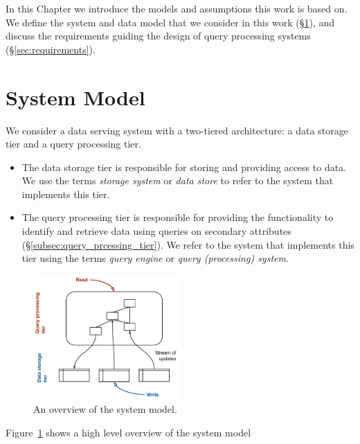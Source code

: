 In this Chapter we introduce the models and assumptions this work is based on.
We define the system and data model that we consider in this work (\S\ref{sec:models}),
and discuss the requirements guiding the design of query processing systems (\S\ref{sec:requirements}).

\section{System Model}
\label{sec:models}
We consider a data serving system with a two-tiered architecture: a data storage tier and a query processing tier.

\begin{itemize}
  \item The data storage tier is responsible for storing and providing access to data.
  We use the terms \textit{storage system} or \textit{data store} to refer to the system that implements this tier.

  \item The query processing tier is responsible for providing the functionality to identify and retrieve data using
  queries on secondary attributes (\S\ref{subsec:query_prcessing_tier}).
  We refer to the system that implements this tier using the terms \textit{query engine} or \textit{query (processing) system}.
\end{itemize}

\begin{figure}
  \centering
    \includegraphics[width=0.5\textwidth]{./figures/models/data_flow.pdf}
  \caption{An overview of the system model.}
  \label{fig:high_level_dataflow}
\end{figure}

\noindent
Figure~\ref{fig:high_level_dataflow} shows a high level overview of the system model

